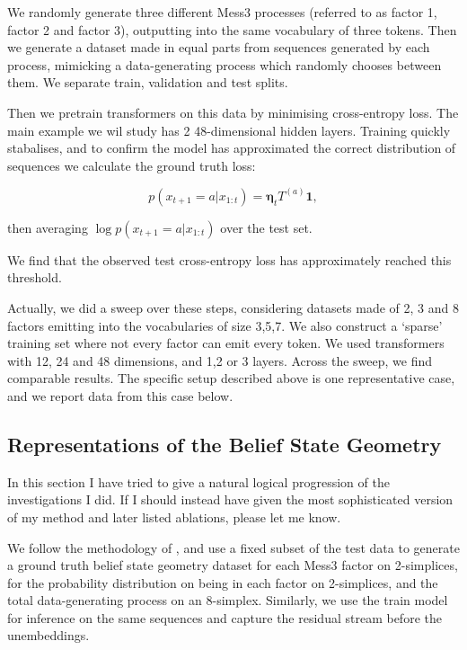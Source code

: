 \documentclass[11pt,a4paper]{article}
\begin{document}
We randomly generate three different Mess3 processes (referred to as factor 1, factor 2 and factor 3), outputting into the same vocabulary of three tokens. Then we generate a dataset made in equal parts from sequences generated by each process, mimicking a data-generating process which randomly chooses between them. We separate train, validation and test splits.

\vspace{5mm}

Then we pretrain transformers on this data by minimising cross-entropy loss. The main example we wil study has 2 48-dimensional hidden layers. Training quickly stabalises, and to confirm the model has approximated the correct distribution of sequences we calculate the ground truth loss:

$$p(x_{t+1}=a|x_{1:t})=\mathbf{\eta}_tT^{(a)}\mathbf{1},$$

then averaging $\log p(x_{t+1}=a|x_{1:t})$ over the test set.

We find that the observed test cross-entropy loss has approximately reached this threshold.

\vspace{5mm}

Actually, we did a sweep over these steps, considering datasets made of 2, 3 and 8 factors emitting into the vocabularies of size 3,5,7. We also construct a `sparse' training set where not every factor can emit every token. We used transformers with 12, 24 and 48 dimensions, and 1,2 or 3 layers. Across the sweep, we find comparable results. The specific setup described above is one representative case, and we report data from this case below. 

\subsection*{Representations of the Belief State Geometry}

In this section I have tried to give a natural logical progression of the investigations I did. If I should instead have given the most sophisticated version of my method and later listed ablations, please let me know.

\vspace{5mm}

We follow the methodology of \cite{shai2024beliefgeometry}, and use a fixed subset of the test data to generate a ground truth belief state geometry dataset for each Mess3 factor on 2-simplices, for the probability distribution on being in each factor on 2-simplices, and the total data-generating process on an 8-simplex. Similarly, we use the train model for inference on the same sequences and capture the residual stream before the unembeddings.
\end{document}
